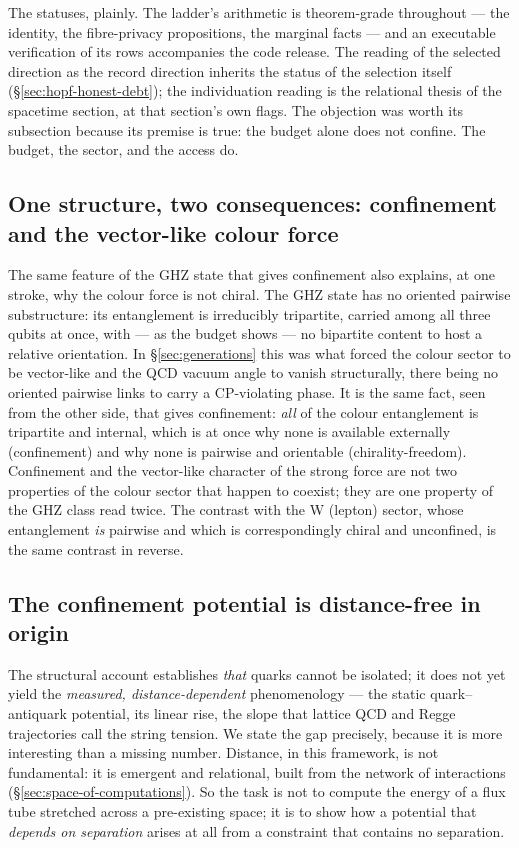 The statuses, plainly. The ladder's arithmetic is theorem-grade throughout --- the identity, the
fibre-privacy propositions, the marginal facts --- and an executable verification of its rows
accompanies the code release. The reading of the selected direction as the record direction
inherits the status of the selection itself (\S\ref{sec:hopf-honest-debt}); the individuation
reading is the relational thesis of the spacetime section, at that section's own flags. The
objection was worth its subsection because its premise is true: the budget alone does not confine.
The budget, the sector, and the access do.

\subsection{One structure, two consequences: confinement and the vector-like colour force}

The same feature of the GHZ state that gives confinement also explains, at one stroke, why the
colour force is not chiral. The GHZ state has no oriented pairwise substructure: its entanglement is
irreducibly tripartite, carried among all three qubits at once, with --- as the budget shows --- no
bipartite content to host a relative orientation. In \S\ref{sec:generations} this was what forced
the colour sector to be vector-like and the QCD vacuum angle to vanish structurally, there being no
oriented pairwise links to carry a CP-violating phase. It is the same fact, seen from the other side,
that gives confinement: \emph{all} of the colour entanglement is tripartite and internal, which is
at once why none is available externally (confinement) and why none is pairwise and orientable
(chirality-freedom). Confinement and the vector-like character of the strong force are not two
properties of the colour sector that happen to coexist; they are one property of the GHZ class read
twice. The contrast with the W (lepton) sector, whose entanglement \emph{is} pairwise and which is
correspondingly chiral and unconfined, is the same contrast in reverse.

\subsection{The confinement potential is distance-free in origin}

The structural account establishes \emph{that} quarks cannot be isolated; it does not yet yield the
\emph{measured, distance-dependent} phenomenology --- the static quark--antiquark potential, its
linear rise, the slope that lattice QCD and Regge trajectories call the string tension. We state the
gap precisely, because it is more interesting than a missing number. Distance, in this framework, is
not fundamental: it is emergent and relational, built from the network of interactions
(\S\ref{sec:space-of-computations}). So the task is not to compute the energy of a flux tube stretched across a
pre-existing space; it is to show how a potential that \emph{depends on separation} arises at all
from a constraint that contains no separation.

